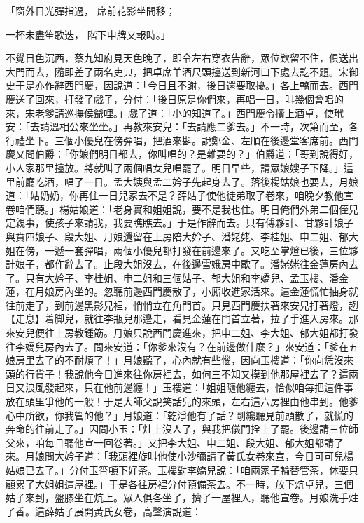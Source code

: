 \begin{showcontents}{}
「窗外日光彈指過，  席前花影坐間移；

一杯未盡笙歌迭，  階下申牌又報時。」

不覺日色沉西，蔡九知府見天色晚了，即令左右穿衣告辭，眾位欵留不住，俱送出大門而去，隨即差了兩名吏典，把卓席羊酒尺頭擡送到新河口下處去訖不題。宋御史于是亦作辭西門慶，因說道：「今日且不謝，後日還要取擾。」各上轎而去。西門慶送了回來，打發了戲子，分付：「後日原是你們來，再唱一日，叫幾個會唱的來，宋老爹請巡撫侯爺哩。」戲了道：「小的知道了。」西門慶令攢上酒卓，使玳安：「去請溫相公來坐坐。」再教來安兒：「去請應二爹去。」不一時，次第而至，各行禮坐下。三個小優兒在傍彈唱，把酒來斟。說鄭金、左順在後邊堂客席前。西門慶又問伯爵：「你娘們明日都去，你叫唱的？是雜耍的？」伯爵道：「哥到說得好，小人家那里擡放。將就叫了兩個唱女兒唱罷了。明日早些，請眾娘嫂子下降。」這里前廳吃酒，唱了一日。孟大姨與孟二妗子先起身去了。落後楊姑娘也要去，月娘道：「姑奶奶，你再住一日兒家去不是？薛姑子使他徒弟取了卷來，咱晚夕教他宣卷咱們聽。」楊姑娘道：「老身實和姐姐說，要不是我也住。明日俺們外弟二個侄兒定親事，使孩子來請我，我要瞧瞧去。」于是作辭而去。只有傅夥計、甘夥計娘子與賁四娘子、段大姐、月娘還留在上房陪大妗子、潘姥姥、李桂姐、申二姐、郁大姐在傍，一遞一套彈唱，兩個小優兒都打發在前邊來了。又吃至掌燈已後，三位夥計娘子，都作辭去了。止段大姐沒去，在後邊雪娥房中歇了。潘姥姥往金蓮房內去了。只有大妗子、李桂姐、申二姐和三個姑子、郁大姐和李嬌兒、孟玉樓、潘金蓮，在月娘房內坐的。忽聽前邊西門慶散了，小廝收進家活來。這金蓮慌忙抽身就往前走了，到前邊黑影兒裡，悄悄立在角門首。只見西門慶扶著來安兒打著燈，趔【走息】着脚兒，就往李瓶兒那邊走，看見金蓮在門首立著，拉了手進入房來。那來安兒便往上房教鍾筯。月娘只說西門慶進來，把申二姐、李大姐、郁大姐都打發往李嬌兒房內去了。問來安道：「你爹來沒有？在前邊做什麼？」來安道：「爹在五娘房里去了的不耐煩了！」月娘聽了，心內就有些惱，因向玉樓道：「你向恁沒來頭的行貨子！我說他今日進來往你房裡去，如何三不知又摸到他那屋裡去了？這兩日又浪風發起來，只在他前邊纏！」玉樓道：「姐姐隨他纏去，恰似咱每把這件事放在頭里爭他的一般！于是大師父說笑話兒的來頭，左右這六房裡由他串到。他爹心中所欲，你我管的他？」月娘道：「乾淨他有了話？剛纔聽見前頭散了，就慌的奔命的往前走了。」因問小玉：「灶上沒人了，與我把儀門拴上了罷。後邊請三位師父來，咱每且聽他宣一回卷著。」又把李大姐、申二姐、段大姐、郁大姐都請了來。月娘問大妗子道：「我頭裡旋叫他使小沙彌請了黃氏女卷來宣，今日可可兒楊姑娘已去了。」分付玉筲頓下好茶。玉樓對李嬌兒說：「咱兩家子輪替管茶，休要只顧累了大姐姐這屋裡。」于是各往房裡分付預備茶去。不一時，放下炕卓兒，三個姑子來到，盤膝坐在炕上。眾人俱各坐了，擠了一屋裡人，聽他宣卷。月娘洗手炷了香。這薛姑子展開黃氏女卷，高聲演說道：


\end{showcontents}
